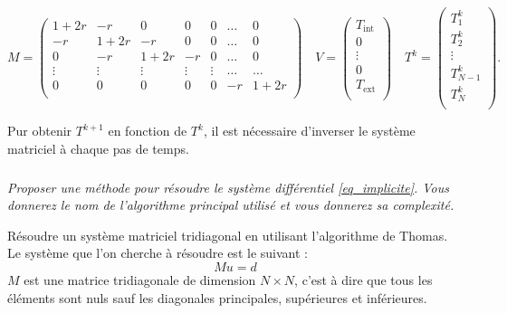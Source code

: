 \documentclass[10pt,fleqn]{article} %
\begin{document}
$$
M = 
\begin{pmatrix}
1+2r & -r     & 0 & 0 & 0 &  \ldots & 0 \\
-r     & 1+2r & -r & 0 & 0  & \ldots &  0 \\
0    & -r & 1+2r & -r & 0   & \ldots&  0 \\
\vdots & \vdots & \vdots & \vdots & \vdots & \ldots & \ldots \\
0& 0& 0& 0& 0& -r & 1+2r\\
\end{pmatrix}
\quad 
V = \begin{pmatrix}
T_{\text{int}} \\
0 \\
\vdots \\
0 \\
T_{\text{ext}} \\
\end{pmatrix}
\quad 
T^k = \begin{pmatrix}
T_1^k \\
T_2^k  \\
\vdots \\
T_{N-1}^k  \\
T_N^k \\
\end{pmatrix}.
$$

Pur obtenir $T^{k+1}$ en fonction de $T^{k}$, il est nécessaire d'inverser le système matriciel à chaque pas de temps.

\subparagraph{}
\textit{Proposer une méthode pour résoudre le système différentiel \ref{eq_implicite}. Vous donnerez le nom de l'algorithme principal utilisé et vous donnerez sa complexité.}

\begin{obj}
Résoudre un système matriciel tridiagonal en utilisant l'algorithme de Thomas. Le système que l'on cherche à résoudre est le suivant : 
$$
M u = d 
$$
$M$ est une matrice tridiagonale de dimension $N\times N$, c'est à dire que tous les éléments sont nuls sauf les diagonales principales, supérieures et inférieures. 
\end{obj}
\end{document}
